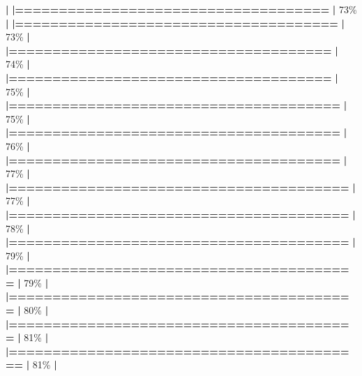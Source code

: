 \documentclass[
]{book}
\newenvironment{Shaded}{\begin{snugshade}}{\end{snugshade}}
\newcommand{\DecValTok}[1]{\textcolor[rgb]{0.00,0.00,0.81}{#1}}
\newcommand{\ErrorTok}[1]{\textcolor[rgb]{0.64,0.00,0.00}{\textbf{#1}}}
\newcommand{\NormalTok}[1]{#1}
\newcommand{\SpecialCharTok}[1]{\textcolor[rgb]{0.81,0.36,0.00}{\textbf{#1}}}
\begin{document}
\begin{Shaded}
\begin{Highlighting}[]
  \SpecialCharTok{|}                                                        
  \ErrorTok{|====================================}              \ErrorTok{|}  \DecValTok{73}\NormalTok{\%}
  \SpecialCharTok{|}                                                        
  \ErrorTok{|=====================================}             \ErrorTok{|}  \DecValTok{73}\NormalTok{\%}
  \SpecialCharTok{|}                                                        
  \ErrorTok{|=====================================}             \ErrorTok{|}  \DecValTok{74}\NormalTok{\%}
  \SpecialCharTok{|}                                                        
  \ErrorTok{|=====================================}             \ErrorTok{|}  \DecValTok{75}\NormalTok{\%}
  \SpecialCharTok{|}                                                        
  \ErrorTok{|======================================}            \ErrorTok{|}  \DecValTok{75}\NormalTok{\%}
  \SpecialCharTok{|}                                                        
  \ErrorTok{|======================================}            \ErrorTok{|}  \DecValTok{76}\NormalTok{\%}
  \SpecialCharTok{|}                                                        
  \ErrorTok{|======================================}            \ErrorTok{|}  \DecValTok{77}\NormalTok{\%}
  \SpecialCharTok{|}                                                        
  \ErrorTok{|=======================================}           \ErrorTok{|}  \DecValTok{77}\NormalTok{\%}
  \SpecialCharTok{|}                                                        
  \ErrorTok{|=======================================}           \ErrorTok{|}  \DecValTok{78}\NormalTok{\%}
  \SpecialCharTok{|}                                                        
  \ErrorTok{|=======================================}           \ErrorTok{|}  \DecValTok{79}\NormalTok{\%}
  \SpecialCharTok{|}                                                        
  \ErrorTok{|========================================}          \ErrorTok{|}  \DecValTok{79}\NormalTok{\%}
  \SpecialCharTok{|}                                                        
  \ErrorTok{|========================================}          \ErrorTok{|}  \DecValTok{80}\NormalTok{\%}
  \SpecialCharTok{|}                                                        
  \ErrorTok{|========================================}          \ErrorTok{|}  \DecValTok{81}\NormalTok{\%}
  \SpecialCharTok{|}                                                        
  \ErrorTok{|=========================================}         \ErrorTok{|}  \DecValTok{81}\NormalTok{\%}
  \SpecialCharTok{|}                                                        

\end{Highlighting}
\end{Shaded}
\end{document}
